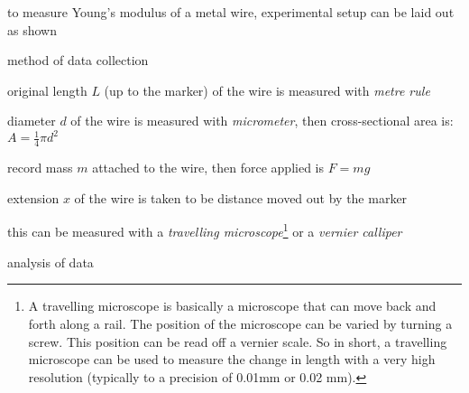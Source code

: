 to measure Young's modulus of a metal wire, experimental setup can be laid out as shown


\begin{figure}[ht]
	\centering
\end{figure}

\cmt method of data collection

\titem original length $L$ (up to the marker) of the wire is measured with \emph{metre rule}

\titem diameter $d$ of the wire is measured with \emph{micrometer}, then cross-sectional area is: $A = \frac{1}{4}\pi d^2$

\titem record mass $m$ attached to the wire, then force applied is $F=mg$

\titem extension $x$ of the wire is taken to be distance moved out by the marker

\phantom{\titem}this can be measured with a \emph{travelling microscope}\footnote{A travelling microscope is basically a microscope that can move back and forth along a rail. The position of the microscope can be varied by turning a screw. This position can be read off a vernier scale. So in short, a travelling microscope can be used to measure the change in length with a very high resolution (typically to a precision of 0.01mm or 0.02 mm).} or a \emph{vernier calliper}

\cmt analysis of data

